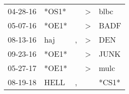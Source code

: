 \begin{supertabular}{lllll}
 04-28-16 &  *OS1* &    &  \textgreater &   blbc \\
 05-07-16 &  *OE1* &    &  \textgreater &   BADF \\
 08-13-16 &    haj &  , &  \textgreater &    DEN \\
 09-23-16 &  *OE1* &    &  \textgreater &   JUNK \\
 05-27-17 &  *OE1* &    &  \textgreater &   mulc \\
 08-19-18 &   HELL &  , &               &  *CS1* \\
\end{supertabular}
